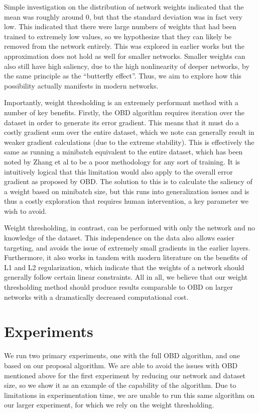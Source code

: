 \documentclass[10pt,twocolumn,letterpaper]{article}
\begin{document}
Simple investigation on the distribution of network weights indicated that the mean was roughly around 0, but that the standard deviation was in fact very low.
This indicated that there were large numbers of weights that had been trained to extremely low values, so we hypothesize that they can likely be removed from the network entirely.
This was explored in earlier works but the approximation does not hold as well for smaller networks.
Smaller weights can also still have high saliency, due to the high nonlinearity of deeper networks, by the same principle as the ``butterfly effect''.
Thus, we aim to explore how this possibility actually manifests in modern networks.

Importantly, weight thresholding is an extremely performant method with a number of key benefits.
Firstly, the OBD algorithm requires iteration over the dataset in order to generate its error gradient.
This means that it must do a costly gradient sum over the entire dataset, which we note can generally result in weaker gradient calculations (due to the extreme stability).
This is effectively the same as running a minibatch equivalent to the entire dataset, which has been noted by Zhang et al \cite{zhang2013asynchronous} to be a poor methodology for any sort of training.
It is intuitively logical that this limitation would also apply to the overall error gradient as proposed by OBD.
The solution to this is to calculate the saliency of a weight based on minibatch size, but this runs into generalization issues and is thus a costly exploration that requires human intervention, a key parameter we wish to avoid.

Weight thresholding, in contrast, can be performed with only the network and no knowledge of the dataset.
This independence on the data also allows easier targeting, and avoids the issue of extremely small gradients in the earlier layers.
Furthermore, it also works in tandem with modern literature on the benefits of L1 and L2 regularization, which indicate that the weights of a network should generally follow certain linear constraints.
All in all, we believe that our weight thresholding method should produce results comparable to OBD on larger networks with a dramatically decreased computational cost.

\section{Experiments}
We run two primary experiments, one with the full OBD algorithm, and one based on our proposal algorithm.
We are able to avoid the issues with OBD mentioned above for the first experiment by reducing our network and dataset size, so we show it as an example of the capability of the algorithm.
Due to limitations in experimentation time, we are unable to run this same algorithm on our larger experiment, for which we rely on the weight thresholding.
\end{document}
